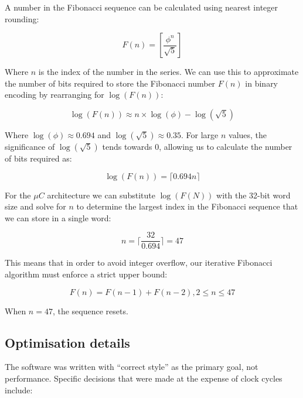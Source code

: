 \documentclass[12pt,a4paper]{article}
\begin{document}
A number in the Fibonacci sequence can be calculated using nearest
integer rounding:

$$F(n) = \left[\frac{\phi^n}{\sqrt{5}}\right] $$

\noindent
Where $n$ is the index of the number in the series. We can use this to
approximate the number of bits required to store the Fibonacci number
$F(n)$ in binary encoding by rearranging for $\log(F(n))$:

$$\log(F(n)) \approx n \times \log(\phi) - \log(\sqrt{5})$$

\noindent
Where $\log(\phi) \approx 0.694$ and $\log(\sqrt{5}) \approx
0.35$. For large $n$ values, the significance of $\log(\sqrt{5})$
tends towards $0$, allowing us to calculate the number of bits
required as:

$$\log(F(n)) = \lceil 0.694n \rceil$$

\noindent
For the $\mu C$ architecture we can substitute $\log(F(N))$ with the
32-bit word size and solve for $n$ to determine the largest index in
the Fibonacci sequence that we can store in a single word:

$$n = \lceil \frac{32}{0.694} \rceil = 47$$

\noindent
This means that in order to avoid integer overflow, our iterative
Fibonacci algorithm must enforce a strict upper bound:

$$F(n) = F(n - 1) + F(n - 2), 2 \le n \le 47$$

\noindent
When $n = 47$, the sequence resets.

\subsection{Optimisation details}

The software was written with ``correct style'' as the primary goal,
not performance. Specific decisions that were made at the expense of
clock cycles include:
\end{document}

